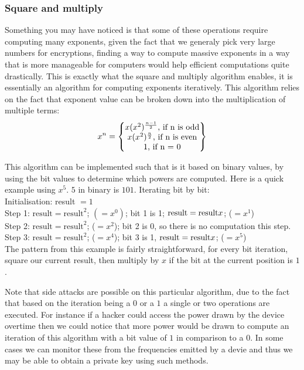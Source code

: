 \documentclass[conference]{IEEEtran}
\begin{document}
\subsubsection{Square and multiply}
Something you may have noticed is that some of these operations require 
computing many exponents, given the fact that we generaly pick very large 
numbers for encryptions, finding a way to compute massive exponents 
in a way that is more manageable for computers would help efficient computations 
quite drastically. This is exactly what the square and multiply algorithm
enables, it is essentially an algorithm for computing exponents iteratively.
This algorithm relies on the fact that exponent value can be broken down into
the multiplication of multiple terms:
\begin{equation*}
    x^{n} =    
    \begin{Bmatrix} 
        x\*(x^{2})^{\frac{n - 1}{2}} \textrm{, if n is odd} \\
        x\*(x^{2})^{\frac{n}{2}} \textrm{, if n is even} \\  
        1 \textrm{, if n = 0} \\  

     \end{Bmatrix}
\end{equation*}


This algorithm can be implemented such that is it based on 
binary values, by using the bit values to determine which 
powers are computed.
Here is a quick example using $x^5$. $5$ in binary is $101$.
Iterating bit by bit: \\
Initialisation: result $= 1$ \\
Step 1: $\textrm{result}=\textrm{result}^2$; $(= x^0)$; bit 1 is 1; $\textrm{result} = \textrm{result}\*x$; ($= x^1$) \\
Step 2: $\textrm{result}=\textrm{result}^2$; ($= x^2$); bit 2 is 0, so there is no computation this step. \\
Step 3: $\textrm{result}=\textrm{result}^2$; ($= x^4$); bit 3 is 1, $\textrm{result} = \textrm{result}\*x$; ($= x^5$) \\

The pattern from this example is fairly straightforward, for every bit iteration, 
square our current result, then multiply by $x$ if the bit at the current position is $1$.


Note that side attacks are possible on this particular algorithm, due to 
the fact that based on the iteration being a $0$ or a $1$ a single or two
operations are executed. For instance if a hacker could access the power drawn
by the device overtime then we could notice that more power would be drawn to
compute an iteration of this algorithm with a bit value of $1$ in comparison to 
a $0$. In some cases we can monitor these from the frequencies emitted by a devie
and thus we may be able to obtain a private key using such methods.
\end{document}
